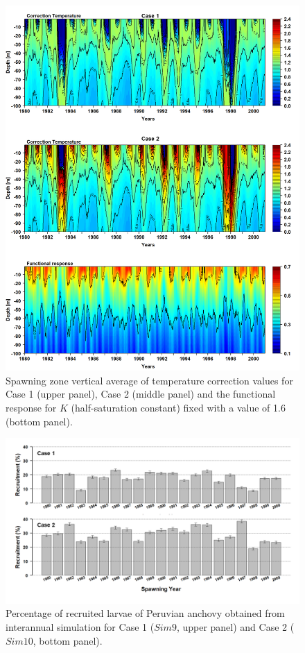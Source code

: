 \begin{figure}[H]
	\includegraphics[width=1.0\textwidth]{figures/Chap3CT_Depth_f_Inter.png}
	\centering
	\caption{Spawning zone vertical average of temperature correction values for Case 1 (upper panel), Case 2 (middle panel) and the functional response for $K$ (half-saturation constant) fixed with a value of 1.6 (bottom panel).}
	\label{Chap3CT_Depth_f_Inter}
\end{figure}

\begin{figure}[H]
	\includegraphics[width=1.0\textwidth]{figures/Chap3RecruitCase1Case2Inter.png}
	\centering
	\caption{Percentage of recruited larvae of Peruvian anchovy obtained from interannual simulation for Case 1 ($Sim 9$, upper panel) and Case 2 ($Sim 10$, bottom panel).}
	\label{Chap3RecruitCase1Case2Inter}
\end{figure}

